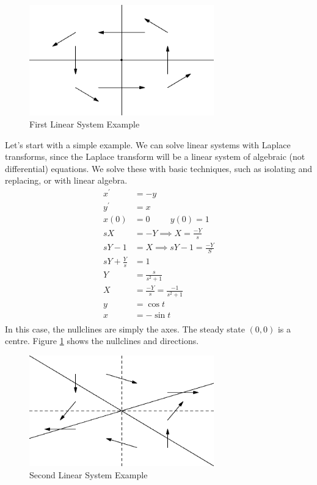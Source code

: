 \documentclass[fleqn,letterpaper]{report}
\begin{document}
\begin{figure}[t]
\centering
\includegraphics[width=8cm]{figure39.eps}
\caption{First Linear System Example}
\label{figure-linear-system1}
\end{figure}

\begin{example}
Let's start with a simple example. We can solve linear
systems with Laplace transforms, since the Laplace transform
will be a linear system of algebraic (not differential)
equations. We solve these with basic techniques, such as
isolating and replacing, or with linear algebra.
\begin{align*}
x^\prime & = -y \\
y^\prime & = x \\
x(0) & = 0 \hspace{1cm} y(0) = 1 \\
sX & = -Y \implies X = \frac{-Y}{s}\\
sY -1 & = X \implies sY - 1 = \frac{-Y}{S} \\
sY + \frac{Y}{s} & = 1 \\
Y & = \frac{s}{s^2+1} \\
X & = \frac{-Y}{s} = \frac{-1}{s^2+1} \\
y & = \cos t \\
x & = - \sin t \\
\end{align*}
In this case, the nullclines are simply the axes. The steady
state $(0,0)$ is a centre. Figure \ref{figure-linear-system1}
shows the nullclines and directions.
\end{example}

\begin{figure}[t]
\centering
\includegraphics[width=8cm]{figure35.eps}
\caption{Second Linear System Example}
\label{figure-linear-system2}
\end{figure}
\end{document}
